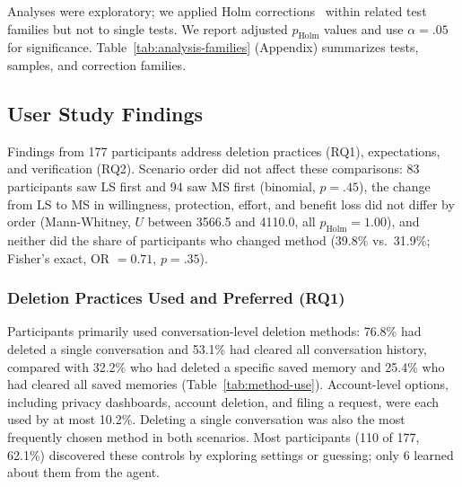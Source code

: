     Analyses were exploratory; we applied Holm corrections~\cite{holm1979simple} within related test families but not to single tests. 
    We report adjusted $p_{\mathrm{Holm}}$ values and use $\alpha=.05$ for significance. 
    Table~\ref{tab:analysis-families} (Appendix) summarizes tests, samples, and correction families.



    \subsection{User Study Findings}
    \label{sec:qual_results}

    Findings from 177 participants address deletion practices (RQ1), expectations, and verification (RQ2).
    Scenario order did not affect these comparisons: 83 participants saw LS first and 94 saw MS first (binomial, $p=.45$), the change from LS to MS in willingness, protection, effort, and benefit loss did not differ by order (Mann-Whitney, $U$ between 3566.5 and 4110.0, all $p_{\mathrm{Holm}}=1.00$), and neither did the share of participants who changed method (39.8\% vs.\ 31.9\%; Fisher's exact, OR $=0.71$, $p=.35$).


    \subsubsection{Deletion Practices Used and Preferred (RQ1)}

    Participants primarily used conversation-level deletion methods: 76.8\% had deleted a single conversation and 53.1\% had cleared all conversation history, compared with 32.2\% who had deleted a specific saved memory and 25.4\% who had cleared all saved memories (Table~\ref{tab:method-use}).
    Account-level options, including privacy dashboards, account deletion, and filing a request, were each used by at most 10.2\%.
    Deleting a single conversation was also the most frequently chosen method in both scenarios.
    Most participants (110 of 177, 62.1\%) discovered these controls by exploring settings or guessing; only 6 learned about them from the agent.


